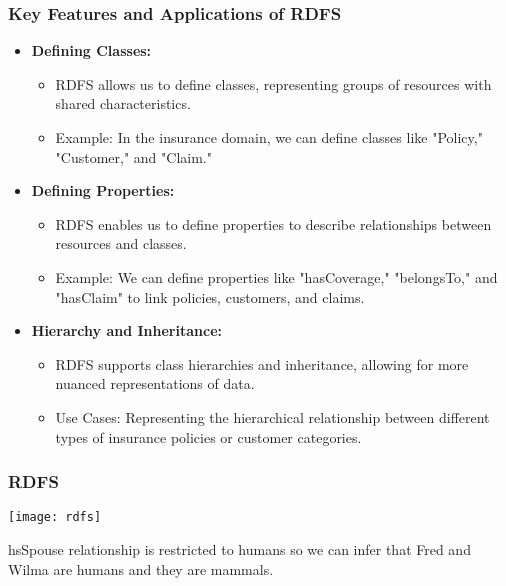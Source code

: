 \begin{frame}[fragile]
\frametitle{Key Features and Applications of RDFS}
\begin{itemize}
\item \textbf{Defining Classes:}
\begin{itemize}
\item RDFS allows us to define classes, representing groups of resources with shared characteristics.
\item Example: In the insurance domain, we can define classes like "Policy," "Customer," and "Claim."
\end{itemize}

\item \textbf{Defining Properties:}
\begin{itemize}
\item RDFS enables us to define properties to describe relationships between resources and classes.
\item Example: We can define properties like "hasCoverage," "belongsTo," and "hasClaim" to link policies, customers, and claims.
\end{itemize}

\item \textbf{Hierarchy and Inheritance:}
\begin{itemize}
\item RDFS supports class hierarchies and inheritance, allowing for more nuanced representations of data.
\item Use Cases: Representing the hierarchical relationship between different types of insurance policies or customer categories.
\end{itemize}
\end{itemize}
\end{frame}

\begin{frame}[fragile]\frametitle{RDFS}

\begin{center}
\texttt{[image: rdfs]}
\end{center}	  

hsSpouse relationship is restricted to humans so we can infer that Fred and Wilma are humans and they are mammals.
\end{frame}


